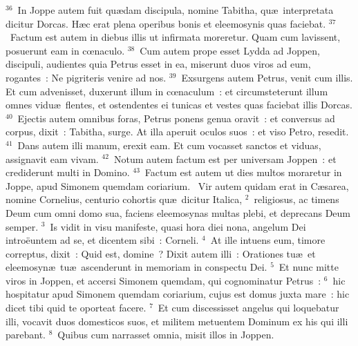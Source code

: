 ${}^{36}$~In Joppe autem fuit qu\ae dam discipula, nomine Tabitha, qu\ae\ interpretata dicitur Dorcas. H\ae c erat plena operibus bonis et eleemosynis quas faciebat.
${}^{37}$~Factum est autem in diebus illis ut infirmata moreretur. Quam cum lavissent, posuerunt eam in cœnaculo.
${}^{38}$~Cum autem prope esset Lydda ad Joppen, discipuli, audientes quia Petrus esset in ea, miserunt duos viros ad eum, rogantes~: Ne pigriteris venire ad nos.
${}^{39}$~Exsurgens autem Petrus, venit cum illis. Et cum advenisset, duxerunt illum in cœnaculum~: et circumsteterunt illum omnes vidu\ae\ flentes, et ostendentes ei tunicas et vestes quas faciebat illis Dorcas.
${}^{40}$~Ejectis autem omnibus foras, Petrus ponens genua oravit~: et conversus ad corpus, dixit~: Tabitha, surge. At illa aperuit oculos suos~: et viso Petro, resedit.
${}^{41}$~Dans autem illi manum, erexit eam. Et cum vocasset sanctos et viduas, assignavit eam vivam.
${}^{42}$~Notum autem factum est per universam Joppen~: et crediderunt multi in Domino.
${}^{43}$~Factum est autem ut dies multos moraretur in Joppe, apud Simonem quemdam coriarium.
~Vir autem quidam erat in C\ae sarea, nomine Cornelius, centurio cohortis qu\ae\ dicitur Italica,
${}^{2}$~religiosus, ac timens Deum cum omni domo sua, faciens eleemosynas multas plebi, et deprecans Deum semper.
${}^{3}$~Is vidit in visu manifeste, quasi hora diei nona, angelum Dei intro\"euntem ad se, et dicentem sibi~: Corneli.
${}^{4}$~At ille intuens eum, timore correptus, dixit~: Quid est, domine~? Dixit autem illi~: Orationes tu\ae\ et eleemosyn\ae\ tu\ae\ ascenderunt in memoriam in conspectu Dei.
${}^{5}$~Et nunc mitte viros in Joppen, et accersi Simonem quemdam, qui cognominatur Petrus~:
${}^{6}$~hic hospitatur apud Simonem quemdam coriarium, cujus est domus juxta mare~: hic dicet tibi quid te oporteat facere.
${}^{7}$~Et cum discessisset angelus qui loquebatur illi, vocavit duos domesticos suos, et militem metuentem Dominum ex his qui illi parebant.
${}^{8}$~Quibus cum narrasset omnia, misit illos in Joppen.



